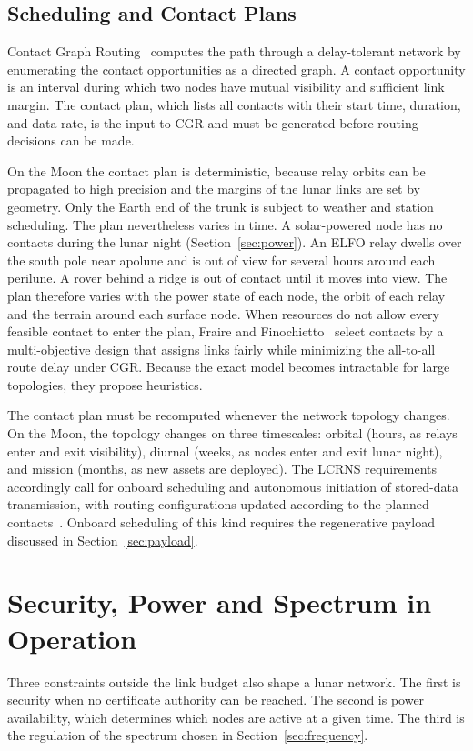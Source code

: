 \documentclass{IEEEoj}
\begin{document}
\subsection{Scheduling and Contact Plans}
Contact Graph Routing~\cite{burleigh_cgr} computes the path through a delay-tolerant network by enumerating the contact opportunities as a directed graph. A contact opportunity is an interval during which two nodes have mutual visibility and sufficient link margin. The contact plan, which lists all contacts with their start time, duration, and data rate, is the input to CGR and must be generated before routing decisions can be made.

On the Moon the contact plan is deterministic, because relay orbits can be propagated to high precision and the margins of the lunar links are set by geometry. Only the Earth end of the trunk is subject to weather and station scheduling. The plan nevertheless varies in time. A solar-powered node has no contacts during the lunar night (Section~\ref{sec:power}). An ELFO relay dwells over the south pole near apolune and is out of view for several hours around each perilune. A rover behind a ridge is out of contact until it moves into view. The plan therefore varies with the power state of each node, the orbit of each relay and the terrain around each surface node. When resources do not allow every feasible contact to enter the plan, Fraire and Finochietto~\cite{fraire_contact_plan} select contacts by a multi-objective design that assigns links fairly while minimizing the all-to-all route delay under CGR. Because the exact model becomes intractable for large topologies, they propose heuristics.

The contact plan must be recomputed whenever the network topology changes. On the Moon, the topology changes on three timescales: orbital (hours, as relays enter and exit visibility), diurnal (weeks, as nodes enter and exit lunar night), and mission (months, as new assets are deployed). The LCRNS requirements accordingly call for onboard scheduling and autonomous initiation of stored-data transmission, with routing configurations updated according to the planned contacts~\cite{nasa_onboard_lunanet}. Onboard scheduling of this kind requires the regenerative payload discussed in Section~\ref{sec:payload}.





\section{Security, Power and Spectrum in Operation}
\label{sec:cross}
Three constraints outside the link budget also shape a lunar network. The first is security when no certificate authority can be reached. The second is power availability, which determines which nodes are active at a given time. The third is the regulation of the spectrum chosen in Section~\ref{sec:frequency}.
\end{document}
